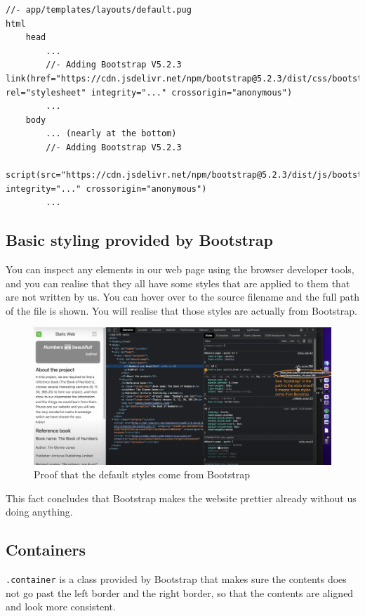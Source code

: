 \begin{lstlisting}[language=pug]
//- app/templates/layouts/default.pug
html
    head
        ...
        //- Adding Bootstrap V5.2.3	link(href="https://cdn.jsdelivr.net/npm/bootstrap@5.2.3/dist/css/bootstrap.min.css" rel="stylesheet" integrity="..." crossorigin="anonymous")
        ...
    body
        ... (nearly at the bottom)
        //- Adding Bootstrap V5.2.3
        script(src="https://cdn.jsdelivr.net/npm/bootstrap@5.2.3/dist/js/bootstrap.bundle.min.js" integrity="..." crossorigin="anonymous")
        ...
\end{lstlisting}

\subsection*{Basic styling provided by Bootstrap}
\label{sec:bootstrapbasic}

You can inspect any elements in our web page using the browser developer tools, and you can realise that they all have some styles that are applied to them that are not written by us. You can hover over to the source filename and the full path of the file is shown. You will realise that those styles are actually from Bootstrap.

\begin{figure}[h]
\centering
\includegraphics[width=15cm]{images/chn7-bootstrap-default-styles.png}
\caption{Proof that the default styles come from  Bootstrap}
\end{figure}

This fact concludes that Bootstrap makes the website prettier already without us doing anything.

\subsection*{Containers}
\label{sec:container}

\texttt{.container} is a class provided by Bootstrap that makes sure the contents does not go past the left border and the right border, so that the contents are aligned and look more consistent. 

